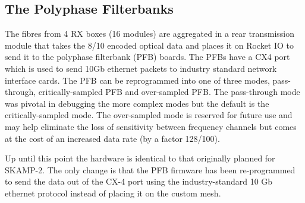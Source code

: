 \subsection{The Polyphase Filterbanks}
The fibres from 4 RX boxes (16 modules) are aggregated in a rear transmission module that takes the 8/10 encoded optical data and places it on Rocket IO to send it to the polyphase filterbank (PFB) boards. The PFBs have a CX4 port which is used to send 10Gb ethernet packets to industry standard network interface cards. The PFB can be reprogrammed into one of three modes, pass-through, critically-sampled PFB and over-sampled PFB. The pass-through mode was pivotal in debugging the more complex modes but the default is the critically-sampled mode. The over-sampled mode is reserved for future use and may help eliminate the loss of sensitivity between frequency channels but comes at the cost of an increased data rate (by a factor 128/100). 

Up until this point the hardware is identical to that originally planned for SKAMP-2. The only change is that the PFB firmware has been re-programmed to send the data out of the CX-4 port using the industry-standard 10 Gb ethernet protocol instead of placing it on the custom mesh.

